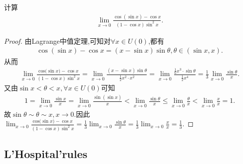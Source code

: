 \documentclass[lang=cn,newtx,10pt,scheme=chinese]{elegantbook}
\begin{document}
\begin{example}
计算
\begin{align*}
\lim_{x \to 0} \frac{\cos(\sin x) - \cos x}{(1 - \cos x)\sin^{2}x}.
\end{align*}
\end{example}
\begin{proof}
由Lagrange中值定理,可知对$\forall x\in U\left( 0 \right)$,都有
\begin{align*}
\cos \left( \sin x \right) -\cos x=\left( x-\sin x \right) \sin \theta ,\theta \in \left( \sin x,x \right) .
\end{align*}
从而
\begin{align*}
\lim_{x\rightarrow 0} \frac{\mathrm{cos(}\sin x)-\cos x}{(1-\cos x)\sin ^2x}=\lim_{x\rightarrow 0} \frac{\left( x-\sin x \right) \sin \theta}{\frac{1}{2}x^2\cdot x^2}=\lim_{x\rightarrow 0} \frac{\frac{1}{6}x^3\cdot \sin \theta}{\frac{1}{2}x^4}=\frac{1}{3}\lim_{x\rightarrow 0} \frac{\sin \theta}{x}.
\end{align*}
又由$\sin x<\theta <x,\forall x\in U\left( 0 \right)$可知
\begin{align*}
1=\lim_{x\rightarrow 0} \frac{\sin x}{x}=\lim_{x\rightarrow 0} \frac{\sin \left( \sin x \right)}{x}<\lim_{x\rightarrow 0} \frac{\sin \theta}{x}\leqslant \lim_{x\rightarrow 0} \frac{\theta}{x}<\lim_{x\rightarrow 0} \frac{x}{x}=1.
\end{align*}
故$\sin \theta \sim \theta \sim x,x\rightarrow 0$.因此$\lim_{x\rightarrow 0} \frac{\mathrm{cos(}\sin x)-\cos x}{(1-\cos x)\sin ^2x}=\frac{1}{3}\lim_{x\rightarrow 0} \frac{\sin \theta}{x}=\frac{1}{3}\lim_{x\rightarrow 0} \frac{x}{x}=\frac{1}{3}$.
\end{proof}



\subsection{L'Hospital'rules}
\end{document}
